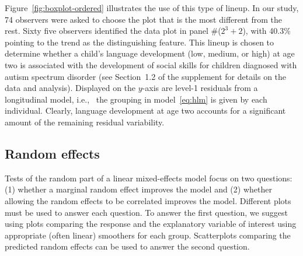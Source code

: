 \documentclass[12pt]{article}
\begin{document}
Figure~\ref{fig:boxplot-ordered} illustrates the use of this type of lineup. In our study, 74 observers were asked to choose the plot that is the most different from the rest. Sixty five observers identified the data plot in panel \#($2^3 + 2$), 
with 40.3\% pointing to the trend as the distinguishing feature. 
This lineup is chosen
to determine whether a child's language development (low, medium, or high) at age two  is associated with the development of social skills for children diagnosed with autism spectrum disorder (see Section~1.2 of the supplement for details on the data and analysis). Displayed on the $y$-axis are level-1 residuals from a longitudinal model, i.e.,~ the grouping in model~\ref{eq:hlm} is given by each individual. Clearly, language development at age two accounts for a significant amount of the remaining residual variability.




\subsection{Random effects}\label{sec:random}
Tests of the random part of a linear mixed-effects model focus on two questions: (1) whether a marginal random effect improves the model and (2) whether allowing the random effects to be correlated improves the model. Different plots must be used to answer each question. To answer the first question, we suggest using plots comparing the response and the explanatory variable of interest using appropriate (often linear) smoothers for each group. Scatterplots comparing the predicted random effects can be used to answer the second question.
\end{document}
